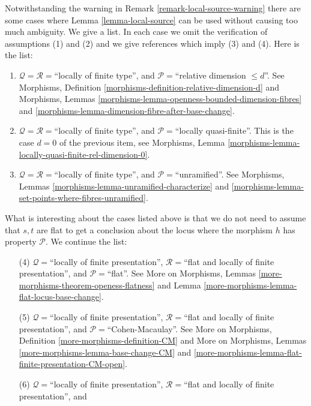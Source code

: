 \begin{remark}
\label{remark-local-source-apply}
Notwithstanding the warning in
Remark \ref{remark-local-source-warning}
there are some cases where
Lemma \ref{lemma-local-source}
can be used without causing too much ambiguity.
We give a list. In each case we omit the verification of
assumptions (1) and (2) and we give references which imply
(3) and (4). Here is the list:
\begin{enumerate}
\item $\mathcal{Q} = \mathcal{R} =$``locally of finite type'', and
$\mathcal{P} =$``relative dimension $\leq d$''.
See
Morphisms, Definition \ref{morphisms-definition-relative-dimension-d}
and
Morphisms, Lemmas \ref{morphisms-lemma-openness-bounded-dimension-fibres} and
\ref{morphisms-lemma-dimension-fibre-after-base-change}.
\item $\mathcal{Q} = \mathcal{R} =$``locally of finite type'', and
$\mathcal{P} =$``locally quasi-finite''.
This is the case $d = 0$ of the previous item, see
Morphisms, Lemma \ref{morphisms-lemma-locally-quasi-finite-rel-dimension-0}.
\item $\mathcal{Q} = \mathcal{R} =$``locally of finite type'', and
$\mathcal{P} =$``unramified''.
See
Morphisms, Lemmas \ref{morphisms-lemma-unramified-characterize} and
\ref{morphisms-lemma-set-points-where-fibres-unramified}.
\end{enumerate}
What is interesting about the cases listed above is that we do not
need to assume that $s, t$ are flat to get a conclusion about the locus
where the morphism $h$ has property $\mathcal{P}$. We continue the
list:
\begin{enumerate}
\item[(4)] $\mathcal{Q} =$``locally of finite presentation'',
$\mathcal{R} =$``flat and locally of finite presentation'', and
$\mathcal{P} =$``flat''. See
More on Morphisms, Lemmas \ref{more-morphisms-theorem-openess-flatness} and
Lemma \ref{more-morphisms-lemma-flat-locus-base-change}.
\item[(5)] $\mathcal{Q} =$``locally of finite presentation'',
$\mathcal{R} =$``flat and locally of finite presentation'', and
$\mathcal{P}=$``Cohen-Macaulay''. See
More on Morphisms, Definition \ref{more-morphisms-definition-CM}
and
More on Morphisms, Lemmas \ref{more-morphisms-lemma-base-change-CM} and
\ref{more-morphisms-lemma-flat-finite-presentation-CM-open}.
\item[(6)] $\mathcal{Q} =$``locally of finite presentation'',
$\mathcal{R} =$``flat and locally of finite presentation'', and

\end{enumerate}
\end{remark}
